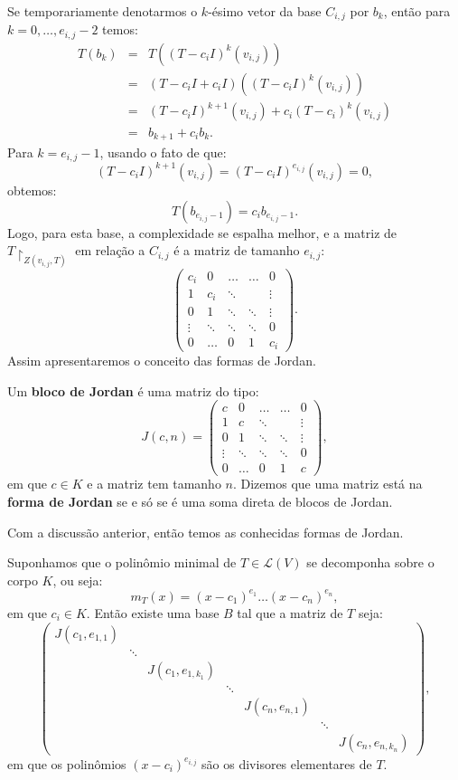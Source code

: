 \documentclass[11pt,twoside,a4paper]{book}
\begin{document}
\medskip
\noindent
Se temporariamente denotarmos o $k$-ésimo vetor da base $C_{i,j}$ por $b_k$, então para $k=0,\dots,e_{i,j}-2$ temos:
\[
\begin{array}{rcl}
T(b_k)&=&T((T-c_iI)^k(v_{i,j}))\\
&=&(T-c_iI+c_iI)((T-c_iI)^k(v_{i,j}))\\
&=&(T-c_iI)^{k+1}(v_{i,j})+c_i(T-c_i)^k(v_{i,j})\\
&=&b_{k+1}+c_ib_k.
\end{array}
\]
Para $k=e_{i,j}-1$, usando o fato de que:
\[
(T-c_iI)^{k+1}(v_{i,j})=(T-c_iI)^{e_{i,j}}(v_{i,j})=0,
\]
obtemos:
\[
T(b_{e_{i,j}-1})=c_ib_{e_{i,j}-1}.
\]
Logo, para esta base, a complexidade se espalha melhor, e a matriz de $T\upharpoonright_{Z(v_{i,j},T)}$ em relação a $C_{i,j}$ é a matriz de tamanho $e_{i,j}$:
\[
\begin{pmatrix}
c_i&0&\ldots&\ldots&0\\1&c_i&\ddots&&\vdots\\0&1&\ddots&\ddots&\vdots\\\vdots&\ddots&\ddots&\ddots&0\\0&\ldots&0&1&c_i
\end{pmatrix}.
\]
Assim apresentaremos o conceito das formas de Jordan.

\begin{definicao}
Um \textbf{bloco de Jordan} é uma matriz do tipo:
\[
J(c,n)=\begin{pmatrix}
c&0&\ldots&\ldots&0\\1&c&\ddots&&\vdots\\0&1&\ddots&\ddots&\vdots\\\vdots&\ddots&\ddots&\ddots&0\\0&\ldots&0&1&c
\end{pmatrix},
\]
em que $c\in K$ e a matriz tem tamanho $n$. Dizemos que uma matriz está na \textbf{forma de Jordan} se e só se é uma soma direta de blocos de Jordan.
\end{definicao}

\noindent
Com a discussão anterior, então temos as conhecidas formas de Jordan.

\begin{teorema}
Suponhamos que o polinômio minimal de $T\in\mathcal{L}(V)$ se decomponha sobre o corpo $K$, ou seja:
\[
m_T(x)=(x-c_1)^{e_1}\dots(x-c_n)^{e_n},
\]
em que $c_i\in K$. Então existe uma base $B$ tal que a matriz de $T$ seja:
\[
\begin{pmatrix}
J(c_1,e_{1,1})&&&&&&\\&\ddots&&&&&\\&&J(c_1,e_{1,k_1})&&&&\\&&&\ddots&&&\\&&&&J(c_n,e_{n,1})&&\\&&&&&\ddots&\\&&&&&&J(c_n,e_{n,k_n})
\end{pmatrix},
\]
em que os polinômios $(x-c_i)^{e_{i,j}}$ são os divisores elementares de $T$.
\end{teorema}
\end{document}
